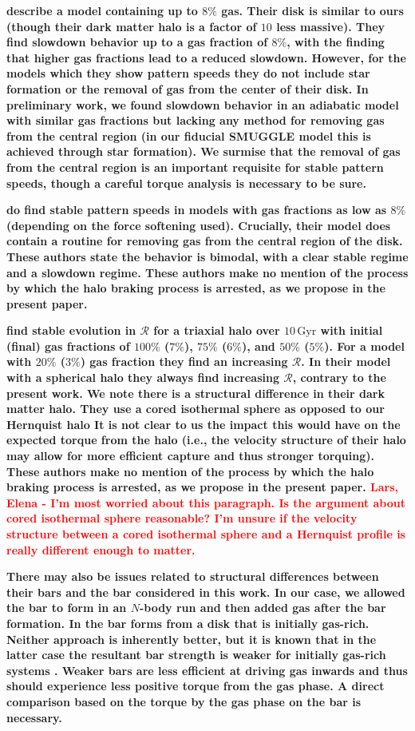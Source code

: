 \documentclass[twocolumn,linenumbers,trackchanges]{aastex631}
\newcommand{\Rot}{\ensuremath{\mathcal{R}}}
\begin{document}
{\bf \citet{2007ApJ...666..189B} describe a model containing up to $8\%$ gas.
Their disk is similar to ours (though their dark matter halo is a factor of $10$
less massive). They find slowdown behavior up to a gas fraction of $8\%$, with
the finding that higher gas fractions lead to a reduced slowdown. However, for
the models which they show pattern speeds they do not include star formation or
the removal of gas from the center of their disk. In preliminary work, we found
slowdown behavior in an adiabatic model with similar gas fractions but lacking
any method for removing gas from the central region (in our fiducial SMUGGLE
model this is achieved through star formation). We surmise that the removal of
gas from the central region is an important requisite for stable pattern speeds,
though a careful torque analysis is necessary to be sure.}

{\bf \citet{2010ApJ...719.1470V} do find stable pattern speeds in models with
gas fractions as low as $8\%$ (depending on the force softening used).
Crucially, their model does contain a routine for removing gas from the central
region of the disk. These authors state the behavior is bimodal, with a clear
stable regime and a slowdown regime. These authors make no mention of the
process by which the halo braking process is arrested, as we propose in the
present paper.}

{\bf \citet{2013MNRAS.429.1949A, 2014MNRAS.438L..81A} find stable evolution in
\Rot{} for a triaxial halo over $10\,\textrm{Gyr}$ with initial (final) gas
fractions of $100\%$ ($7\%$), $75\%$ ($6\%$), and $50\%$ ($5\%$). For a model
with $20\%$ ($3\%$) gas fraction they find an increasing \Rot{}. In their model
with a spherical halo they always find increasing \Rot{}, contrary to the
present work. We note there is a structural difference in their dark matter
halo. They use a cored isothermal sphere as opposed to our Hernquist halo It is
not clear to us the impact this would have on the expected torque from the halo
(i.e., the velocity structure of their halo may allow for more efficient capture
and thus stronger torquing). These authors make no mention of the process by
which the halo braking process is arrested, as we propose in the present paper.
\textcolor{red}{Lars, Elena - I'm most worried about this paragraph. Is the
argument about cored isothermal sphere reasonable? I'm unsure if the velocity
structure between a cored isothermal sphere and a Hernquist profile is really
different enough to matter.} }

{\bf There may also be issues related to structural differences between their
bars and the bar considered in this work. In our case, we allowed the bar to
form in an $N$-body run and then added gas after the bar formation. In
\citet{2013MNRAS.429.1949A, 2014MNRAS.438L..81A} the bar forms from a disk that
is initially gas-rich. Neither approach is inherently better, but it is known
that in the latter case the resultant bar strength is weaker for initially
gas-rich systems \citep[e.g.,][]{2013MNRAS.429.1949A}. Weaker bars are less
efficient at driving gas inwards \citep{2004ApJ...600..595R} and thus should
experience less positive torque from the gas phase. A direct comparison based on
the torque by the gas phase on the bar is necessary.}
\end{document}
